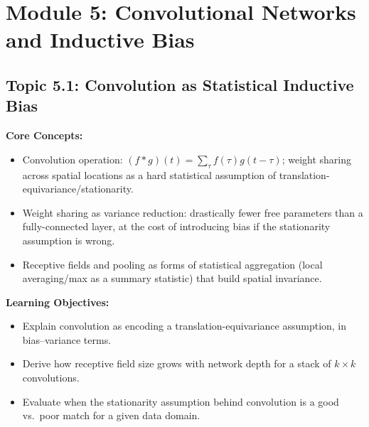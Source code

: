 \documentclass[11pt]{article}
\begin{document}
\section{Module 5: Convolutional Networks and Inductive Bias}

\subsection{Topic 5.1: Convolution as Statistical Inductive Bias}

\textbf{Core Concepts:}
\begin{itemize}
  \item Convolution operation: $(f * g)(t) = \sum_\tau f(\tau) g(t-\tau)$; weight sharing across spatial locations as a hard statistical assumption of translation-equivariance/stationarity.
  \item Weight sharing as variance reduction: drastically fewer free parameters than a fully-connected layer, at the cost of introducing bias if the stationarity assumption is wrong.
  \item Receptive fields and pooling as forms of statistical aggregation (local averaging/max as a summary statistic) that build spatial invariance.
\end{itemize}

\textbf{Learning Objectives:}
\begin{itemize}
  \item Explain convolution as encoding a translation-equivariance assumption, in bias--variance terms.
  \item Derive how receptive field size grows with network depth for a stack of $k\times k$ convolutions.
  \item Evaluate when the stationarity assumption behind convolution is a good vs.\ poor match for a given data domain.
\end{itemize}
\end{document}
